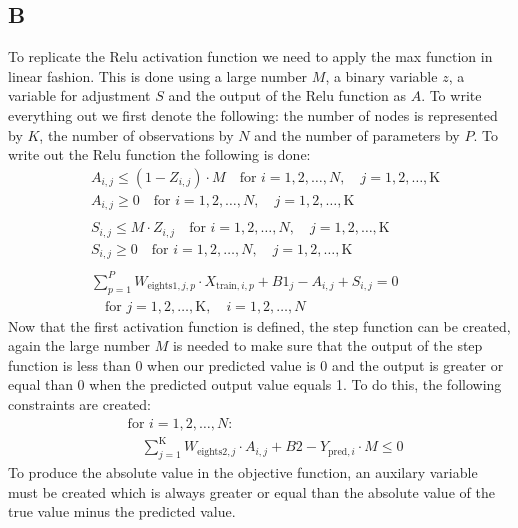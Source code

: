 \subsection*{B}
To replicate the Relu activation function we need to apply the max function in linear fashion. This is done using a large number $M$, a binary variable $z$, a variable for adjustment $S$ and the output of the Relu function as $A$. To write everything out we first denote the following: the number of nodes is represented by $K$, the number of observations by $N$ and the number of parameters by $P$. To write out the Relu function the following is done:
\begin{align*}
    &A_{i, j} \leq (1 - Z_{i, j}) \cdot M \quad \text{for } i = 1, 2, \ldots, N, \quad j = 1, 2, \ldots, \text{K} \\
    &A_{i, j} \geq 0 \quad \text{for } i = 1, 2, \ldots, N, \quad j = 1, 2, \ldots, \text{K} \\
    \\
    &S_{i, j} \leq M \cdot Z_{i, j} \quad \text{for } i = 1, 2, \ldots, N, \quad j = 1, 2, \ldots, \text{K} \\
    &S_{i, j} \geq 0 \quad \text{for } i = 1, 2, \ldots, N, \quad j = 1, 2, \ldots, \text{K} \\
    \\
    &\sum_{p=1}^{P} W_{\text{eights1}, j, p} \cdot X_{\text{train}, i, p} + B1_j - A_{i, j} + S_{i, j} = 0 \\
    &\quad \text{for } j = 1, 2, \ldots, \text{K}, \quad i = 1, 2, \ldots, N
\end{align*}
Now that the first activation function is defined, the step function can be created, again the large number $M$ is needed to make sure that the output of the step function is less than 0 when our predicted value is 0 and the output is greater or equal than 0 when the predicted output value equals 1. To do this, the following constraints are created:
\begin{align*}
    &\text{for } i = 1, 2, \ldots, N: \\
    &\quad \sum_{j=1}^{\text{K}} W_{\text{eights2}, j} \cdot A_{i, j} + B2 - Y_{\text{pred}, i} \cdot M \leq 0
\end{align*}
To produce the absolute value in the objective function, an auxilary variable must be created which is always greater or equal than the absolute value of the true value minus the predicted value.
